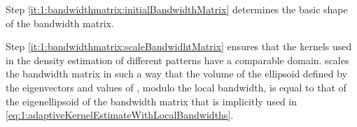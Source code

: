 		Step \ref{it:1:bandwidthmatrix:initialBandwidthMatrix} determines the basic shape of the bandwidth matrix. 

		Step \ref{it:1:bandwidthmatrix:scaleBandwidhtMatrix} ensures that the kernels used in the density estimation of different patterns have a comparable domain.  scales the bandwidth matrix in such a way that the volume of the ellipsoid defined by the eigenvectors and values of \varBandwidthMatrix[\itXis], modulo the local bandwidth, is equal to that of the eigenellipsoid of the bandwidth matrix that is implicitly used in \cref{eq:1:adaptiveKernelEstimateWithLocalBandwidths}.